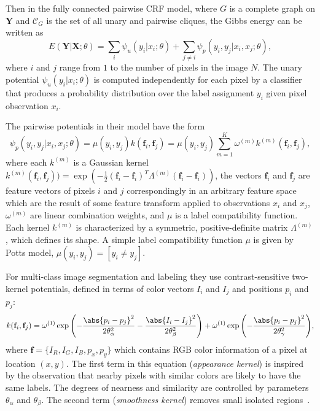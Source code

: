 Then in the fully connected pairwise CRF model, where $G$ is a complete graph on $\mathbf{Y}$ and $\mathcal{C}_G$ is the
set of all unary and pairwise cliques, the Gibbs energy can be written as
\begin{equation}
 E(\mathbf{Y} | \mathbf{X}; \theta) = \sum_{i} \psi_u(y_i | x_i; \theta) + \sum_{j \neq i} \psi_p(y_i, y_j | x_i, x_j; \theta),
\end{equation}
where $i$ and $j$ range from $1$ to the number of pixels in the image $N$. The unary potential $\psi_u(y_i | x_i; \theta)$ is
computed independently for each pixel by a classifier that produces a probability distribution over the label assignment $y_i$
given pixel observation $x_i$.

The pairwise potentials in their model have the form
\begin{equation}
 \psi_p(y_i, y_j | x_i, x_j; \theta) = \mu(y_i, y_j) k(\mathbf{f}_i, \mathbf{f}_j) = \mu(y_i, y_j) \sum_{m=1}^{K} \omega^{(m)} k^{(m)}(\mathbf{f}_i, \mathbf{f}_j), \label{sum_of_gaussians}
\end{equation}
where each $k^{(m)}$ is a Gaussian kernel 
$k^{(m)}(\mathbf{f}_i, \mathbf{f}_j)) = \exp{\left(-\frac{1}{2}\left(\mathbf{f}_i - \mathbf{f}_i\right)^T \Lambda^{(m)}\left(\mathbf{f}_i - \mathbf{f}_i\right)\right)}$,
the vectors $\mathbf{f}_i$ and $\mathbf{f}_j$ are feature vectors of pixels $i$ and $j$ correspondingly in an arbitrary 
feature space which are the result of some feature transform applied to observations $x_i$ and $x_j$, 
$\omega^{(m)}$ are linear combination weights, and $\mu$ is a label compatibility function. Each kernel
$k^{(m)}$ is characterized by a symmetric, positive-definite matrix $\Lambda^{(m)}$, which defines its shape. A simple label
compatibility function $\mu$ is given by Potts model, $\mu(y_i, y_j) = [y_i \neq y_j]$.

For multi-class image segmentation and labeling they use contrast-sensitive two-kernel potentials, defined in terms of color
vectors $I_i$ and $I_j$ and positions $p_i$ and $p_j$:
\begin{equation}
 k(\mathbf{f}_i, \mathbf{f}_j) = \omega^{(1)}\exp{\left( -\frac{\abs{p_i - p_j}^2}{2\theta_{\alpha}^2} -\frac{\abs{I_i - I_j}^2}{2\theta_{\beta}^2}\right)} + \omega^{(1)}\exp{\left( -\frac{\abs{p_i - p_j}^2}{2\theta_{\gamma}^2}\right)},
\end{equation}
where $\mathbf{f} = \{I_R, I_G, I_B, p_x, p_y\}$ which contains RGB color information of a pixel at location $(x, y)$.
The first term in this equation (\emph{appearance kernel}) is inspired by the observation that nearby pixels with similar colors
are likely to have the same labels. The degrees of nearness and similarity are controlled by parameters $\theta_{\alpha}$ and
$\theta_{\beta}$. The second term (\emph{smoothness kernel}) removes small isolated regions~\cite{Shotton2009}.

